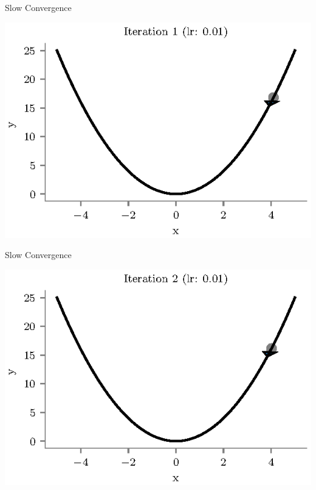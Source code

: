 \documentclass{beamer}
\begin{document}
\begin{frame}{Slow Convergence}
\begin{center}
\includegraphics[totalheight=6cm]{gradient-descent/undershooting-1.eps}
\end{center}
\end{frame}

\begin{frame}{Slow Convergence}
\begin{center}
\includegraphics[totalheight=6cm]{gradient-descent/undershooting-2.eps}
\end{center}
\end{frame}
\end{document}

